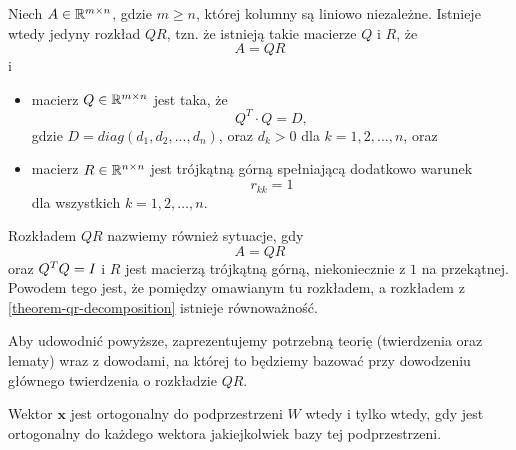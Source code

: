 \documentclass[12pt,a4paper]{report}
\newcommand{\vr}[1]{\mathbf{#1}}
\newcommand{\mx}[1]{{#1}}
\begin{document}
\begin{theorem}[O rozkładzie QR]\label{theorem-qr-decomposition}
Niech $\mx{A} \in \setR^{m \times n}$, gdzie $m\ge n$, której kolumny są liniowo niezależne. Istnieje wtedy jedyny rozkład $\mx{QR}$, tzn. że istnieją takie macierze $\mx{Q}$ i $\mx{R}$, że
$$
\mx{A} = \mx{Q} \mx{R}
$$ 
i
\begin{itemize}
\item macierz $\mx{Q} \in \setR^{m \times n} $ jest taka, że 
$$
Q^{T}\cdot Q=D,
$$
gdzie $D= diag (d_{1}, d_{2}, ..., d_{n})$, oraz $d_{k}>0$ dla $k = 1, 2, \ldots, n$, oraz
\item macierz $\mx{R} \in \setR^{n \times n}$ jest trójkątną górną spełniającą dodatkowo warunek 
$$
r_{kk}= 1 
$$ 
dla wszystkich $k = 1, 2, \ldots, n$.
\end{itemize} 
\end{theorem}

\begin{remark}
Rozkładem $\mx{QR}$ nazwiemy również sytuacje, gdy 
$$
\mx{A}=\mx{Q}\mx{R}
$$
oraz $\transpose{\mx{Q}}\mx{Q}=\mx{I}$ i $\mx{R}$ jest macierzą trójkątną górną, niekoniecznie z $1$ na przekątnej. Powodem tego jest, że pomiędzy omawianym tu rozkładem, a rozkładem z \ref{theorem-qr-decomposition} istnieje równoważność.  
\end{remark}

Aby udowodnić powyższe, zaprezentujemy potrzebną teorię (twierdzenia oraz lematy) wraz z dowodami, na której to będziemy bazować przy dowodzeniu głównego twierdzenia o rozkładzie $QR$. 

\begin{theorem}
Wektor $\vr{x}$ jest ortogonalny do podprzestrzeni $W$ wtedy i tylko wtedy, gdy jest ortogonalny do każdego wektora jakiejkolwiek bazy tej podprzestrzeni.
\end{theorem}
\end{document}
